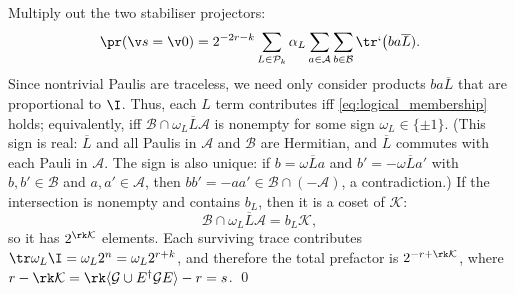 Multiply out the two stabiliser projectors:
\begin{equation}
\label{eq:trace_triple}
\pr(\v s =\v 0)
=2^{-2r -k} \sum_{L \in \mathcal P_k} \alpha_L
\sum_{a \in \mathcal A} \sum_{b \in \mathcal B}
\tr`\big(ba \overline{L}).
\end{equation}
Since nontrivial Paulis are traceless,
we need only consider products
$ba \overline{L}$
that are proportional to $\I$.
Thus, each $L$ term contributes iff \cref{eq:logical_membership} holds;
equivalently,
iff $\mathcal B\cap\omega_L\overline L\mathcal A$ is nonempty
for some sign $\omega_L\in\{\pm1\}$.
(This sign is real:
	$\overline{L}$ and all Paulis in $\mathcal A$ and $\mathcal B$ are Hermitian,
	and $\overline{L}$ commutes with each Pauli in $\mathcal A$.
The sign is also unique:
	if $b=\omega\overline L a$ and
	$b'=-\omega\overline L a'$ with
	$b,b'\in\mathcal B$ and $a,a'\in\mathcal A$,
	then $bb'=-aa'\in\mathcal B\cap(-\mathcal A)$,
	a contradiction.)
If the intersection is nonempty and contains $b_L$,
then it is a coset of $\mathcal K$:
\begin{equation}
\mathcal B\cap\omega_L\overline L\mathcal A=b_L\mathcal K,
\end{equation}
so it has $2^{\rk\mathcal K}$ elements.
Each surviving trace contributes
$\tr \omega_L \I= \omega_L 2^n =\omega_L 2^{r +k}$,
and therefore the total prefactor is
$2^{-r+\rk\mathcal K}$,
where
$r-\rk\mathcal K
=\rk\langle\mathcal G\cup E^\dagger\mathcal G E\rangle-r
=s$. \qed

